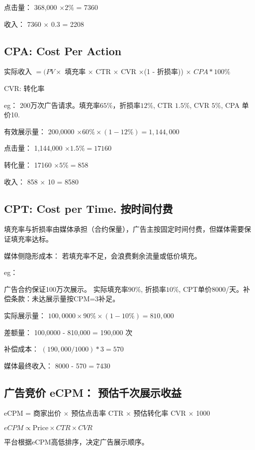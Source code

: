 \documentclass{article}
\begin{document}
点击量： 368,000 $\times 2\%$  = 7360

收入： 7360 $\times$ 0.3 = 2208


\subsection{CPA: Cost Per Action}
 实际收入 $= (PV \times$ 填充率 $\times$ CTR $\times$ CVR $\times$(1 - 折损率)) $\times$ $CPA * 100\% $

 CVR: 转化率

eg：
200万次广告请求。填充率$65\%$，折损率$12\%$, CTR $1.5\%$, CVR $5\%$, CPA 单价10.

有效展示量： 200,0000 $\times 60\% \times (1-12\%) = 1,144,000$

点击量： 1,144,000 $\times 1.5\% = 17160$

转化量： 17160 $ \times 5\% = 858$

收入： 858 $\times$ 10 = 8580


\subsection{CPT: Cost per Time. 按时间付费}
填充率与折损率由媒体承担（合约保量），广告主按固定时间付费，但媒体需要保证填充率达标。

媒体侧隐形成本： 若填充率不足，会浪费剩余流量或低价填充。

eg：

广告合约保证100万次展示。 实际填充率$90\%$, 折损率$10\%$, CPT单价8000/天。补偿条款：未达展示量按CPM=3补足。

实际展示量： $100,0000 \times 90\% \times (1-10\%) = 810,000$

差额量： 100,0000 - 810,000 = 190,000 次 

补偿成本： $(190,000 / 1000) * 3 = 570$ 

媒体最终收入： 8000 - 570 = 7430

\subsection{广告竞价 eCPM： 预估千次展示收益}

eCPM = 商家出价  $\times$ 预估点击率 CTR $\times$ 预估转化率 CVR $\times$ 1000

 $eCPM \varpropto \text{Price} \times CTR \times CVR$ 

平台根据eCPM高低排序，决定广告展示顺序。

% 
\end{document}
